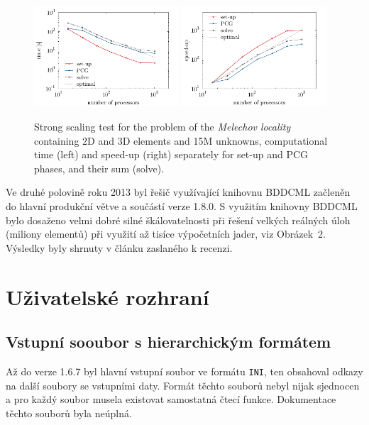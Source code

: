\documentclass[11pt]{report}
\begin{document}
\begin{figure}[h]
\begin{center}
\includegraphics[width=0.48\textwidth]{timing_melechov_large} 
\includegraphics[width=0.48\textwidth]{speedup_melechov_large}
\end{center}
\caption{\label{fig:timing_Melechov_large}
Strong scaling test for the problem of the \emph{Melechov locality}
containing 2D and 3D elements and 15M unknowns, computational time (left) and
speed-up (right) separately for set-up and PCG phases, and their sum (solve).}
\end{figure}

Ve druhé polovině roku 2013 byl řešič využívající knihovnu BDDCML začleněn do 
hlavní produkční větve a součástí verze 1.8.0. S využitím knihovny BDDCML bylo 
dosaženo velmi dobré silné škálovatelnosti při řešení velkých reálných úloh 
(miliony elementů) při využití až tisíce výpočetních jader, viz Obrázek~2. 
Výsledky byly shrnuty v článku \cite{SistekBDDC} zaslaného k recenzi.




\section{Uživatelské rozhraní}
\subsection{Vstupní sooubor s hierarchickým formátem}
Až do verze 1.6.7 byl hlavní vstupní soubor ve formátu \verb'INI', 
ten obsahoval odkazy na další soubory se vstupními daty. Formát těchto souborů 
nebyl nijak sjednocen a pro každý soubor musela existovat samostatná čtecí 
funkce. Dokumentace těchto souborů byla neúplná.
\end{document}
